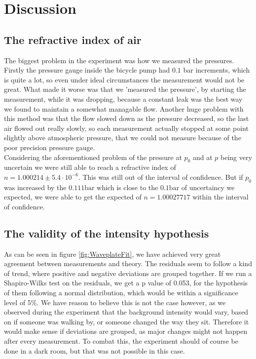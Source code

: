 \chapter{Discussion}
\section{The refractive index of air}
The biggest problem in the experiment was how we measured the pressures.
Firstly the pressure gauge inside the bicycle pump had $0.1$ bar increments, which is quite a lot, so even under ideal circumstances the measurement would not be great.
What made it worse was that we 'measured the pressure', by starting the measurement, while it was dropping, because a constant leak was the best way we found to maintain a somewhat managable flow.
Another huge problem with this method was that the flow slowed down as the pressure decreased, so the last air flowed out really slowly, 
so each measurement actually stopped at some point slightly above atmospheric pressure, that we could not measure because of the poor precision pressure gauge.\\
Considering the aforementioned problem of the pressure at $p_{0}$ and at $p$ being very uncertain we were still able to reach a refractive index of $n=1.000214 \pm 5.4 \cdot10^{-6}$.
This was still out of the interval of confidence. But if $p_{0}$ was increased by the $0.111 \text{bar}$ which is close to the $0.1 \text{bar}$ of uncertaincy we expected, we were able to get the expected of $n=1.00027717$ \autocite{air} within the interval of confidence.
\section{The validity of the intensity hypothesis}
As can be seen in figure \ref{fig:WaveplateFit}, 
we have achieved very great agreement between measurements and theory.
The residuals seem to follow a kind of trend, where positive and negative deviations are grouped together.
If we run a Shapiro-Wilks test on the residuals, we get a p value of 0.053, for the hypothesis of them following a normal distribution,
which would be within a significance level of 5\%.
We have reason to believe this is not the case however, 
as we observed during the experiment that the background intensity would vary, based on if someone was walking by, 
or someone changed the way they sit. 
Therefore it would make sense if deviations are grouped, as major changes might not happen after every measurement.
To combat this, the experiment should of course be done in a dark room, but that was not possible in this case.